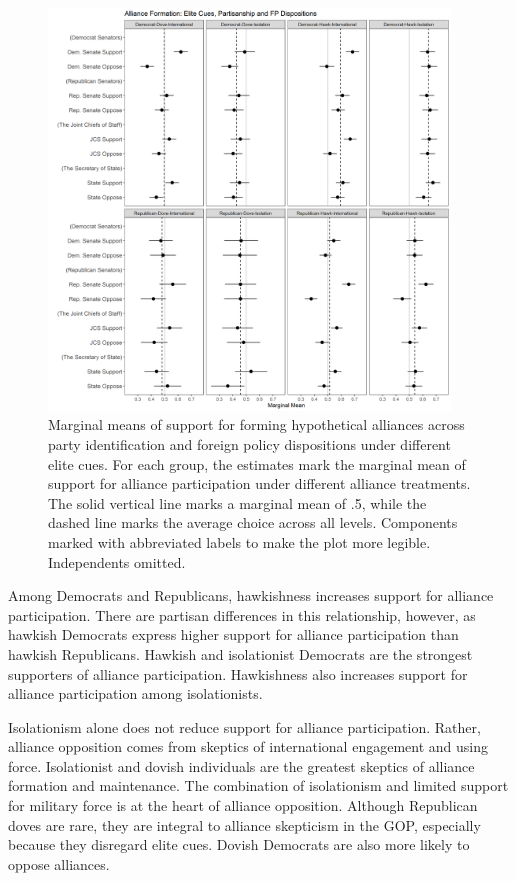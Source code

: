 \documentclass[12pt]{article}
\begin{document}
\begin{figure}[htpb]
	\centering
		\includegraphics[width=0.95\textwidth]{../figures/party-dispo-form-el.png}
	\caption{Marginal means of support for forming hypothetical alliances across party identification and foreign policy dispositions under different elite cues. For each group, the estimates mark the marginal mean of support for alliance participation under different alliance treatments. The solid vertical line marks a marginal mean of .5, while the dashed line marks the average choice across all levels. Components marked with abbreviated labels to make the plot more legible. Independents omitted.}
	\label{fig:party-dispo-form-el}
\end{figure}


Among Democrats and Republicans, hawkishness increases support for alliance participation. 
There are partisan differences in this relationship, however, as hawkish Democrats express higher support for alliance participation than hawkish Republicans. 
Hawkish and isolationist Democrats are the strongest supporters of alliance participation. 
Hawkishness also increases support for alliance participation among isolationists. 


Isolationism alone does not reduce support for alliance participation.
Rather, alliance opposition comes from skeptics of international engagement and using force. 
Isolationist and dovish individuals are the greatest skeptics of alliance formation and maintenance. 
The combination of isolationism and limited support for military force is at the heart of alliance opposition. 
Although Republican doves are rare, they are integral to alliance skepticism in the GOP, especially because they disregard elite cues. 
Dovish Democrats are also more likely to oppose alliances.  
\end{document}
